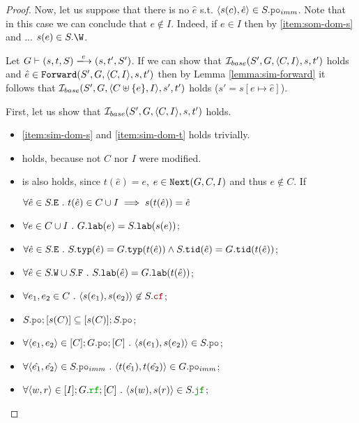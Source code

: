 \documentclass[12pt]{article}
\begin{document}
\begin{proof}
  Now, let us suppose that there is no $\hat{e}$ s.t. $\tup{s(c), \hat{e}} \in S.\lPO_{imm}$.
  Note that in this case we can conclude that $e \not\in I$.
  Indeed, if $e \in I$ then by \ref{item:som-dom-s} and ...
  $s(e) \in S.\W$.
  
  Let $G \vdash (s, t, S) \ESstep{e} (s, t', S')$.
  If we can show that $\mathcal{I}_{base}(S', G, \langle C, I \rangle, s, t')$ holds and
  $\hat{e} \in {\mathtt{Forward}}(S', G, \langle C, I \rangle, s, t')$ then by Lemma \ref{lemma:sim-forward}
  it follows that $\mathcal{I}_{base}(S', G, \langle C \uplus \{e\}, I \rangle, s', t')$ holds
  ($s' = s[e \mapsto \hat{e}]$).

  First, let us show that $\mathcal{I}_{base}(S', G, \langle C, I \rangle, s, t')$ holds.

  \begin{itemize}

  \item \ref{item:sim-dom-s} and \ref{item:sim-dom-t} holds trivially.

  \item \label{item:sim-ts-id} holds, because not $C$ nor $I$ were modified.

  \item \label{item:sim-st-id} is also holds, since $t(\hat{e}) = e$, $e \in {\mathtt{Next}}(G, C, I)$
    and thus $e \not\in C$.
    If 
    
    $\forall{\hat{e} \in S.{\mathtt{E}}} ~.~ t(\hat{e}) \in C \cup I \implies s(t(\hat{e})) = \hat{e}$
   
  \item \label{item:sim-lab}
    $\forall{e \in C \cup I} ~.~ G.{\mathtt{lab}}(e) = S.{\mathtt{lab}}(s(e))$;

  \item \label{item:sim-typ-tid}
      $\forall{\hat{e} \in S.{\mathtt{E}}} ~.~
      S.{\mathtt{typ}}(\hat{e}) = G.{\mathtt{typ}}(t(\hat{e})) \wedge
      S.{\mathtt{tid}}(\hat{e}) = G.{\mathtt{tid}}(t(\hat{e}))
      $;

  \item \label{item:sim-lab-wf}
    $\forall{\hat{e} \in S.{\mathtt{W}}\cup S.{\mathtt{F}}} ~.~ S.{\mathtt{lab}}(\hat{e}) = G.{\mathtt{lab}}(t(\hat{e}))$;

  \item \label{item:sim-cf}
    $\forall{e_1, e_2 \in C} ~.~ \tup{s(e_1), s(e_2)} \not\in S.\lCF$;

  \item \label{item:sim-po-prfx} 
    $S.\lPO;[s(\lC)] \subseteq [s(C)];S.\lPO$;

  \item \label{item:sim-po}
    $\forall{\tup{e_1, e_2} \in [C];G.\lPO;[C]} ~.~ \tup{s(e_1), s(e_2)} \in S.\lPO$;

  \item \label{item:sim-po-imm}
    $\forall{\tup{\hat{e_1}, \hat{e_2}} \in S.\lPO_{imm}} ~.~
     \tup{t(\hat{e_1}), t(\hat{e_2})} \in G.\lPO_{imm}$;

  \item \label{item:sim-rf} 
    $\forall{\tup{w, r} \in [I];G.\lRF;[C]} ~.~ \tup{s(w), s(r)} \in S.\lJF$;
  \end{itemize}
  
  
\end{proof}
\end{document}
